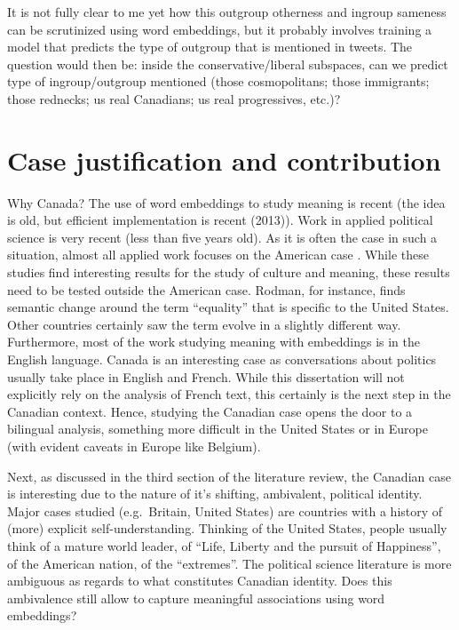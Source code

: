 \documentclass[
  openany]{book}
\begin{document}
It is not fully clear to me yet how this outgroup otherness and ingroup sameness can be scrutinized using word embeddings, but it probably involves training a model that predicts the type of outgroup that is mentioned in tweets. The question would then be: inside the conservative/liberal subspaces, can we predict type of ingroup/outgroup mentioned (those cosmopolitans; those immigrants; those rednecks; us real Canadians; us real progressives, etc.)?

\hypertarget{case-justification-and-contribution}{%
\chapter{Case justification and contribution}\label{case-justification-and-contribution}}

Why Canada? The use of word embeddings to study meaning is recent (the idea is old, but efficient implementation is recent (2013)). Work in applied political science is very recent (less than five years old). As it is often the case in such a situation, almost all applied work focuses on the American case \citep[\citet{kozlowski2019geometry}]{rodman2020timely}. While these studies find interesting results for the study of culture and meaning, these results need to be tested outside the American case. Rodman, for instance, finds semantic change around the term ``equality'' that is specific to the United States. Other countries certainly saw the term evolve in a slightly different way. Furthermore, most of the work studying meaning with embeddings is in the English language. Canada is an interesting case as conversations about politics usually take place in English and French. While this dissertation will not explicitly rely on the analysis of French text, this certainly is the next step in the Canadian context. Hence, studying the Canadian case opens the door to a bilingual analysis, something more difficult in the United States or in Europe (with evident caveats in Europe like Belgium).

Next, as discussed in the third section of the literature review, the Canadian case is interesting due to the nature of it's shifting, ambivalent, political identity. Major cases studied (e.g.~Britain, United States) are countries with a history of (more) explicit self-understanding. Thinking of the United States, people usually think of a mature world leader, of ``Life, Liberty and the pursuit of Happiness'', of the American nation, of the ``extremes''. The political science literature is more ambiguous as regards to what constitutes Canadian identity. Does this ambivalence still allow to capture meaningful associations using word embeddings?
\end{document}
